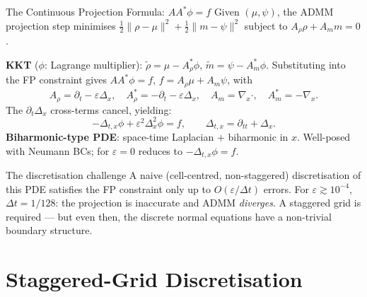 \documentclass[10pt,aspectratio=169]{beamer}
\newcommand{\eps}{\varepsilon}
\newcommand{\Lapx}{\Delta_x}          %
\newcommand{\Laptx}{\Delta_{t,x}}     %
\newcommand{\Bihar}{\Delta_x^2}       %
\newcommand{\divx}{\nabla_{\!x}\cdot} %
\newcommand{\gradx}{\nabla_{\!x}}     %
\begin{document}
\begin{frame}{The Continuous Projection Formula: $AA^*\phi = f$}
  Given $(\mu,\psi)$, the ADMM projection step minimises
  $\tfrac{1}{2}\|\rho-\mu\|^2 + \tfrac{1}{2}\|m-\psi\|^2$
  subject to $A_\rho\rho + A_m m = 0$.

  \smallskip
  \textbf{KKT} ($\phi$: Lagrange multiplier):
  $\tilde\rho = \mu - A_\rho^*\phi$,\;
  $\tilde m = \psi - A_m^*\phi$.
  Substituting into the FP constraint gives $AA^*\phi = f$,\;
  $f = A_\rho\mu + A_m\psi$, with
  \[
    A_\rho = \partial_t - \eps\Lapx,\quad
    A_\rho^* = -\partial_t - \eps\Lapx,\quad
    A_m = \divx,\quad
    A_m^* = -\gradx.
  \]
  The $\partial_t\Lapx$ cross-terms cancel, yielding:
  \[
    \boxed{-\Laptx\phi + \eps^2\Bihar\phi = f,}
    \qquad \Laptx = \partial_{tt} + \Lapx.
  \]
  \textbf{Biharmonic-type PDE}: space-time Laplacian $+$ biharmonic in $x$.
  Well-posed with Neumann BCs; for $\eps=0$ reduces to $-\Laptx\phi=f$.

  \smallskip
  \begin{alertblock}{The discretisation challenge}
    A naive (cell-centred, non-staggered) discretisation of this PDE
    satisfies the FP constraint only up to $O(\eps/\Delta t)$ errors.
    For $\eps \gtrsim 10^{-4}$, $\Delta t=1/128$: the projection is
    inaccurate and ADMM \emph{diverges}.
    A staggered grid is required — but even then, the discrete
    normal equations have a non-trivial boundary structure.
  \end{alertblock}
\end{frame}

\section{Staggered-Grid Discretisation}
\end{document}
